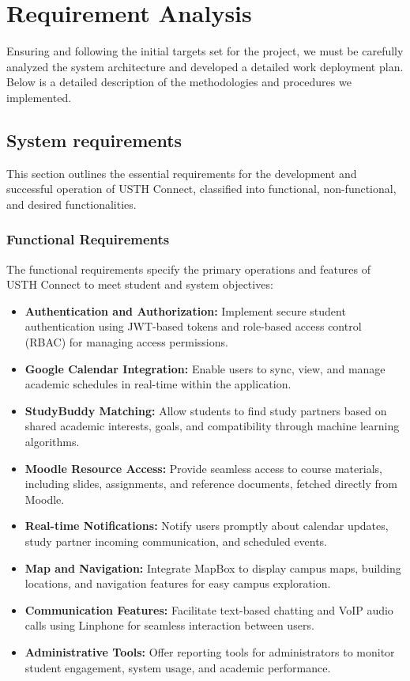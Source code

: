 \documentclass{article}
\begin{document}
\section{Requirement Analysis}
Ensuring and following the initial targets set for the project, we must be carefully analyzed the system
architecture and developed a detailed work deployment plan. Below is a detailed description of
the methodologies and procedures we implemented.

\subsection{System requirements}
This section outlines the essential requirements for the development and successful operation of USTH Connect, classified into functional, non-functional, and desired functionalities.  

\subsubsection{Functional Requirements}
The functional requirements specify the primary operations and features of USTH Connect to meet student and system objectives:  
\begin{itemize}  
    \item \textbf{Authentication and Authorization:} Implement secure student authentication using JWT-based tokens and role-based access control (RBAC) for managing access permissions.  
    \item \textbf{Google Calendar Integration:} Enable users to sync, view, and manage academic schedules in real-time within the application.  
    \item \textbf{StudyBuddy Matching:} Allow students to find study partners based on shared academic interests, goals, and compatibility through machine learning algorithms.  
    \item \textbf{Moodle Resource Access:} Provide seamless access to course materials, including slides, assignments, and reference documents, fetched directly from Moodle.  
    \item \textbf{Real-time Notifications:} Notify users promptly about calendar updates, study partner incoming communication, and scheduled events.  
    \item \textbf{Map and Navigation:} Integrate MapBox to display campus maps, building locations, and navigation features for easy campus exploration.  
    \item \textbf{Communication Features:} Facilitate text-based chatting and VoIP audio calls using Linphone for seamless interaction between users.  
    \item \textbf{Administrative Tools:} Offer reporting tools for administrators to monitor student engagement, system usage, and academic performance.  
\end{itemize}  
\end{document}
